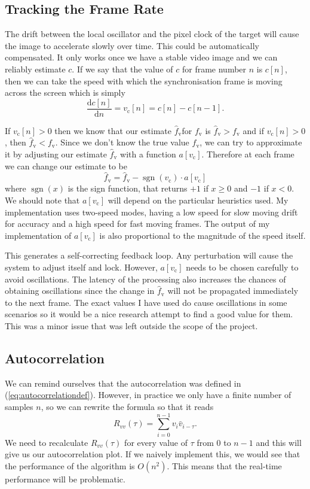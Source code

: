 \documentclass[a4paper,12pt,twoside,openright]{report}
\begin{document}
\subsection{Tracking the Frame Rate}

The drift between the local oscillator and the pixel clock of the target will cause the image to accelerate slowly over time. This could be automatically compensated. It only works once we have a stable video image and we can reliably estimate $c$. If we say that the value of $c$ for frame number $n$ is $c[n]$, then we can take the speed with which the synchronisation frame is moving across the screen which is simply
$$\frac{\text{d} c[n]}{\text{d} n} = v_\text{c}[n] = c[n] - c[n-1] .$$

If $v_\text{c}[n] > 0$ then we know that our estimate  $\hat{f}_\text{v}$for $f_\text{v}$ is $\hat{f}_\text{v} > f_\text{v}$ and if $v_\text{c}[n] > 0$, then $\hat{f}_\text{v} < f_\text{v}$. Since we don't know the true value $f_\text{v}$, we can try to approximate it by adjusting our estimate $\hat{f}_\text{v}$ with a function $a[v_\text{c}]$. Therefore at each frame we can change our estimate to be
$$\hat{f}_\text{v} = \hat{f}_\text{v} - \operatorname{sgn}(v_\text{c}) \cdot a[v_\text{c}] $$
where $\operatorname{sgn}(x)$ is the sign function, that returns $+1$ if $x \geq 0$ and $-1$ if $x < 0$. We should note that $a[v_\text{c}]$ will depend on the particular heuristics used. My implementation uses two-speed modes, having a low speed for slow moving drift for accuracy and a high speed for fast moving frames. The output of my implementation of $a[v_\text{c}]$ is also proportional to the magnitude of the speed itself.

This generates a self-correcting feedback loop. Any perturbation will cause the system to adjust itself and lock. However, $a[v_\text{c}]$ needs to be chosen carefully to avoid oscillations. The latency of the processing also increases the chances of obtaining oscillations since the change in $\hat{f}_\text{v}$ will not be propagated immediately to the next frame. The exact values I have used do cause oscillations in some scenarios so it would be a nice research attempt to find a good value for them. This was a minor issue that was left outside the scope of the project.

\subsection{Autocorrelation}

We can remind ourselves that the autocorrelation was defined in (\ref{eq:autocorrelationdef}). However, in practice we only have a finite number of samples $n$, so we can rewrite the formula so that it reads
$$R_{vv}(\tau)=\sum\limits_{i=0}^{n-1} v_{i} \bar{v}_{i-\tau} .$$
We need to recalculate $R_{vv}(\tau)$ for every value of $\tau$ from $0$ to $n-1$ and this will give us our autocorrelation plot. If we naively implement this, we would see that the performance of the algorithm is $O(n^2)$. This means that the real-time performance will be problematic.
\end{document}
